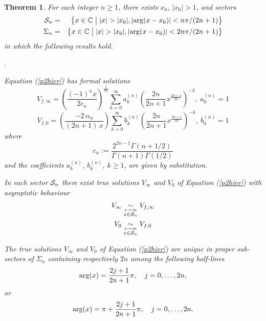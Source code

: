 \documentclass{amsart}
\newtheorem{theorem}{Theorem}[section]
\theoremstyle{definition}
\theoremstyle{remark}
\theoremstyle{remark}
\begin{document}
\begin{theorem}\label{main}
    For each integer $n\ge 1$, there exists $x_{0}$, $|x_{0}|>1$,
    and sectors
    \begin{eqnarray*}
      \Se_n&=&\left\{x\in\Complex\bigm| |x|>|x_{0}|,
        |\arg(x-x_{0})|<n\pi/(2n+1)\right\}\\
  \Sigma_n&=&\left\{x\in\Complex\bigm| |x|>|x_{0}|,
    |\arg(x-x_{0})|<2n\pi/(2n+1)\right\}
  \end{eqnarray*}
    in which the following results hold.
\begin{list}{\rm{}.}{
\setlength{\leftmargin}{8truept}}
\item Equation (\ref{p2hier}) has formal solutions
    \begin{equation}
       \label{n2.5}
        V_{f, \infty}=\left(\frac{(-1)^{n}x}{2c_{n}}\right)^{\frac{1}{2n}}
        \sum_{k=0}^{\infty} a_{k}^{(n)}\left(\frac{2n}{2n+1}
        x^{\frac{2n+1}{2n}}\right)^{-k},\ a_{0}^{(n)}=1
        \end{equation}
    \begin{equation}
      \label{n3.5}
        V_{f, 0}=\left(\frac{-2\,\alpha_{n}}{(2n+1)\,x}\right)
        \sum_{k=0}^{\infty} b_{k}^{(n)}\left(\frac{2n}{2n+1}
        x^{\frac{2n+1}{2n}}\right)^{-k},\ b_{0}^{(n)}=1
        \end{equation}
    where
    \[c_{n}:=\frac{2^{2n-1}\Gamma(n+1/2)}{\Gamma(n+1)\Gamma(1/2)}\]
and the coefficients $a_{k}^{(n)}$, $b_{k}^{(n)}$, $k\ge 1$,
are given by substitution.
\item
   In each sector ${\mathcal S}_n$ there exist true solutions
$V_{\infty}$ and $V_{0}$ of Equation (\ref{p2hier}) with asymptotic behaviour
    \begin{align*}
        V_{\infty}&\underset{{\overset{x\to\infty}{x\in{\mathcal S}_n}}}{\sim}
          V_{f,\infty}\\
        V_{0}&\underset{{\overset{x\to\infty}{x\in{\mathcal S}_n}}}{\sim} V_{f,0}
        \end{align*}
\item The true solutions $V_{\infty}$ and $V_{0}$ of
    Equation (\ref{p2hier}) are unique in proper sub-sectors of $\Sigma_n$
containing respectively $2n$ among the following half-lines
\begin{equation}
{\rm arg}(x) = {2j+1\over 2n+1}\pi,
\quad j=0,\dots,2n,
\label{n2.66}\end{equation}
or
\begin{equation}
{\rm arg}(x) = \pi + {2j+1\over 2n+1}\pi,
\quad j=0,\dots,2n.
\label{n3.66}\end{equation}
\end{list}
    \end{theorem}
\end{document}
